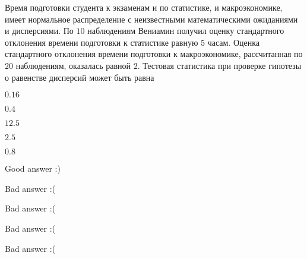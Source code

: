 
\begin{question}
Время подготовки студента к экзаменам и по статистике, и макроэкономике,
имеет нормальное распределение с неизвестными математическими ожиданиями
и дисперсиями. По \(10\) наблюдениям Вениамин получил оценку
стандартного отклонения времени подготовки к статистике равную \(5\)
часам. Оценка стандартного отклонения времени подготовки к
макроэкономике, рассчитанная по \(20\) наблюдениям, оказалась равной
\(2\). Тестовая статистика при проверке гипотезы о равенстве дисперсий
может быть равна
\begin{answerlist}
  \item \(0.16\)
  \item \(0.4\)
  \item \(12.5\)
  \item \(2.5\)
  \item \(0.8\)
\end{answerlist}
\end{question}

\begin{solution}
\begin{answerlist}
  \item Good answer :)
  \item Bad answer :(
  \item Bad answer :(
  \item Bad answer :(
  \item Bad answer :(
\end{answerlist}
\end{solution}

